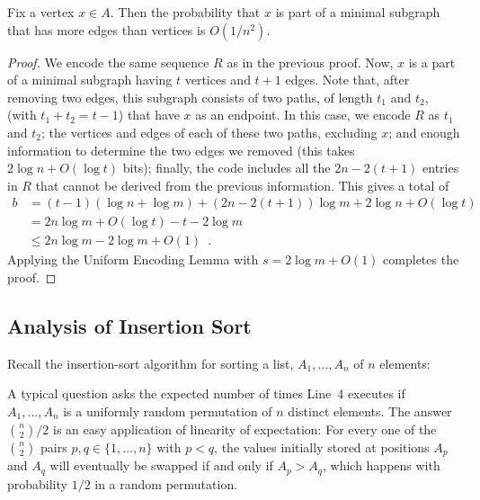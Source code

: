 \documentclass{patmorin}
\begin{document}
\begin{thm}
  Fix a vertex $x\in A$.  Then the probability that $x$ is part of a
  minimal subgraph that has more edges than vertices is $O(1/n^2)$.
\end{thm}

\begin{proof}
  We encode the same sequence $R$ as in the previous proof. Now, $x$
  is a part of a minimal subgraph having $t$ vertices and $t+1$
  edges. Note that, after removing two edges, this subgraph consists
  of two paths, of length $t_1$ and $t_2$, (with $t_1+t_2=t-1$) that
  have $x$ as an endpoint.  In this case, we encode $R$ as $t_1$ and
  $t_2$; the vertices and edges of each of these two paths, excluding
  $x$; and enough information to determine the two edges we removed
  (this takes $2\log n + O(\log t)$ bits); finally, the code includes
  all the $2n-2(t+1)$ entries in $R$ that cannot be derived from the
  previous information. This gives a total of
  \begin{align*}
     b &= (t-1)(\log n+\log m) + (2n-2(t+1))\log m + 2\log n + O(\log t) \\
        &= 2n\log m + O(\log t) - t - 2\log m \\
       & \le 2n\log m - 2\log m + O(1) \enspace .
  \end{align*}
  Applying the Uniform Encoding Lemma with $s=2\log m+O(1)$ completes
  the proof.
\end{proof}

\subsection{Analysis of Insertion Sort}

Recall the insertion-sort algorithm for sorting a list, $A_1,\ldots,A_n$
of $n$ elements:

\begin{algorithmic}[1]
     \ENDWHILE
  \ENDFOR
\end{algorithmic}

A typical question asks the expected number of times Line~4 executes
if $A_1,\ldots,A_n$ is a uniformly random permutation of $n$ distinct
elements.  The answer $\binom{n}{2}/2$ is an easy application of
linearity of expectation: For every one of the $\binom{n}{2}$ pairs
$p,q\in\{1,\ldots,n\}$ with $p<q$, the values initially stored at
positions $A_p$ and $A_q$ will eventually be swapped if and only if $A_p >
A_q$, which happens with probability $1/2$ in a random permutation.
\end{document}
